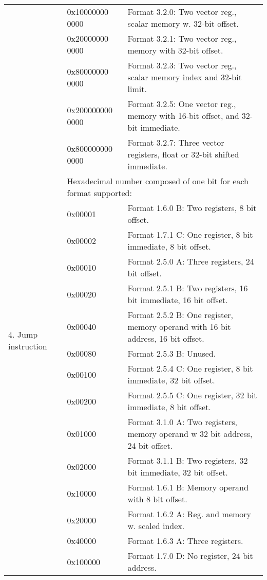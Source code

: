 \documentclass[forwardcom.tex]{subfiles}
\begin{document}
\begin{longtable} {|p{18mm}|p{20mm} p{80mm}|}
  &  0x10000000 0000 & Format 3.2.0: Two vector reg., scalar memory w. 32-bit offset. \\
  &  0x20000000 0000 & Format 3.2.1: Two vector reg., memory with 32-bit offset. \\
  &  0x80000000 0000 & Format 3.2.3: Two vector reg., scalar memory index and 32-bit limit. \\
  &  0x200000000 0000 & Format 3.2.5: One vector reg., memory with 16-bit offset, and 32-bit immediate. \\
  &  0x800000000 0000 & Format 3.2.7: Three vector registers, float or 32-bit shifted immediate.\\

\hline

\multirow{12}{*}{\parbox[t]{18mm}{4. Jump instruction}} 
  &  \multicolumn{2}{|l|}{
     Hexadecimal number composed of one bit for each format supported:} \\
  &  0x00001 & Format 1.6.0 B: Two registers, 8 bit offset. \\
  &  0x00002 & Format 1.7.1 C: One register, 8 bit immediate, 8 bit offset. \\
  &  0x00010 & Format 2.5.0 A: Three registers, 24 bit offset. \\
  &  0x00020 & Format 2.5.1 B: Two registers, 16 bit immediate, 16 bit offset. \\
  &  0x00040 & Format 2.5.2 B: One register, memory operand with 16 bit address, 16 bit  offset. \\
  &  0x00080 & Format 2.5.3 B: Unused. \\
  &  0x00100 & Format 2.5.4 C: One register, 8 bit immediate, 32 bit offset. \\
  &  0x00200 & Format 2.5.5 C: One register, 32 bit immediate, 8 bit offset. \\  
  &  0x01000 & Format 3.1.0 A: Two registers, memory operand w 32 bit address, 24 bit offset. \\
  &  0x02000 & Format 3.1.1 B: Two registers, 32 bit immediate, 32 bit offset. \\  
  &  0x10000 & Format 1.6.1 B: Memory operand with 8 bit offset. \\
  &  0x20000 & Format 1.6.2 A: Reg. and memory w. scaled index. \\
  &  0x40000 & Format 1.6.3 A: Three registers. \\  
  &  0x100000 & Format 1.7.0 D: No register, 24 bit address. \\  

\end{longtable}
\end{document}
